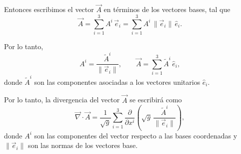 \documentclass[../apunte_mecanica_clasica.tex]{subfiles}%
\begin{document}
Entonces escribimos el vector $\vec{A}$ en términos de los vectores bases, tal que
\begin{equation*}
    \vec{A} = \sum_{i=1}^3 A^i \,\vec{e}_i 
            = \sum_{i=1}^3 A^i \,\|\vec{e}_i\| \,\hat{e}_i.
\end{equation*}

Por lo tanto,
\begin{equation*}
    A^i = \frac{\tilde{A}^i}{\|\vec{e}_i\|}, 
    \qquad \vec{A} = \sum_{i=1}^3 \tilde{A}^i \,\hat{e}_i,
\end{equation*}
donde $\tilde{A}^i$ son las componentes asociadas a los vectores unitarios $\hat{e}_i$.

Por lo tanto, la divergencia del vector $\vec{A}$ se escribirá como
\begin{equation*}
    \vec{\nabla}\cdot \vec{A} 
    = \frac{1}{\sqrt{g}} \sum_{i=1}^3 
      \frac{\partial}{\partial x^i} \left( \sqrt{g}\, \frac{\tilde{A}^i}{\|\vec{e}_i\|} \right),
\end{equation*}
donde $A^i$ son las componentes del vector respecto a las bases coordenadas
y $\|\vec{e}_i\|$ son las normas de los vectores base.
\end{document}
